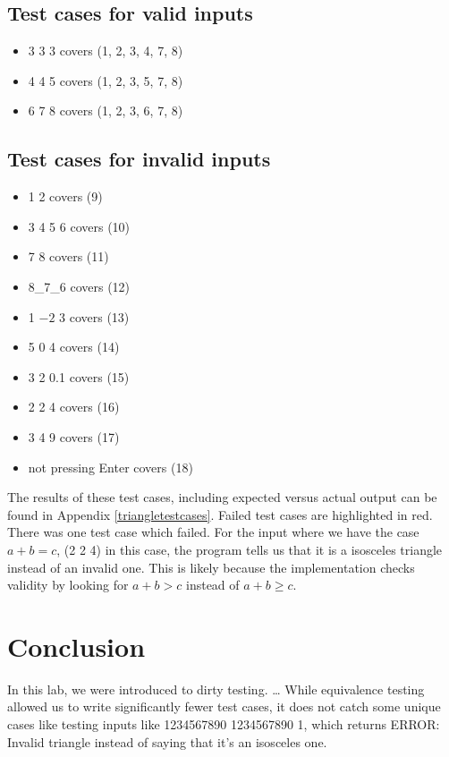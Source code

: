 \documentclass[letterpaper]{article}
\begin{document}
\subsection*{Test cases for valid inputs}
\begin{itemize}
    \item 3 3 3 covers (1, 2, 3, 4, 7, 8)
    \item 4 4 5 covers (1, 2, 3, 5, 7, 8)
    \item 6 7 8 covers (1, 2, 3, 6, 7, 8)
\end{itemize}

\subsection*{Test cases for invalid inputs}
\begin{itemize}
    \item 1 2 covers (9)
    \item 3 4 5 6 covers (10)
    \item 7 8  covers (11)
    \item 8\_7\_6 covers (12)
    \item 1 $-2$ 3 covers (13)
    \item 5 0 4 covers (14)
    \item 3 2 0.1 covers (15)
    \item 2 2 4 covers (16)
    \item 3 4 9 covers (17)
    \item not pressing Enter covers (18)
\end{itemize}

The results of these test cases, including expected versus actual output can be found in Appendix \ref{triangletestcases}.
Failed test cases are highlighted in red. There was one test case which failed. For the input where we have the case $a+b=c$,
(2 2 4) in this case, the program tells us that it is a isosceles triangle instead of an invalid one.
This is likely because the implementation checks validity by looking for $a+b>c$ instead of $a+b \geq c$.


\section*{Conclusion}
In this lab, we were introduced to dirty testing. 
\dots
While equivalence testing allowed us to write significantly fewer test cases,
it does not catch some unique cases like testing inputs like 1234567890 1234567890 1, which returns ERROR: Invalid triangle
instead of saying that it's an isosceles one.
\end{document}
